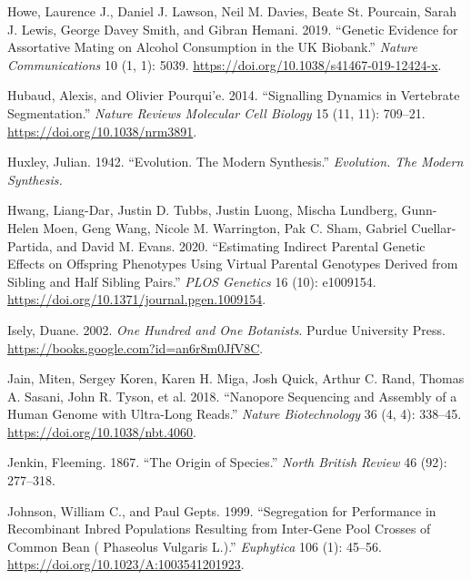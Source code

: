 \documentclass[
]{book}
\newlength{\cslhangindent}
\newlength{\cslentryspacingunit} %
\newenvironment{CSLReferences}[2] %
 {%
  \setlength{\parindent}{0pt}
  \ifodd #1
  \let\oldpar\par
  \def\par{\hangindent=\cslhangindent\oldpar}
  \fi
  \setlength{\parskip}{#2\cslentryspacingunit}
 }%
 {}
\begin{document}
\begin{CSLReferences}{1}{0}
\leavevmode{}%
Howe, Laurence J., Daniel J. Lawson, Neil M. Davies, Beate St. Pourcain, Sarah J. Lewis, George Davey Smith, and Gibran Hemani. 2019. {``Genetic Evidence for Assortative Mating on Alcohol Consumption in the {UK Biobank}.''} \emph{Nature Communications} 10 (1, 1): 5039. \url{https://doi.org/10.1038/s41467-019-12424-x}.

\leavevmode{}%
Hubaud, Alexis, and Olivier Pourqui'e. 2014. {``Signalling Dynamics in Vertebrate Segmentation.''} \emph{Nature Reviews Molecular Cell Biology} 15 (11, 11): 709--21. \url{https://doi.org/10.1038/nrm3891}.

\leavevmode{}%
Huxley, Julian. 1942. {``Evolution. {The} Modern Synthesis.''} \emph{Evolution. The Modern Synthesis.}

\leavevmode{}%
Hwang, Liang-Dar, Justin D. Tubbs, Justin Luong, Mischa Lundberg, Gunn-Helen Moen, Geng Wang, Nicole M. Warrington, Pak C. Sham, Gabriel Cuellar-Partida, and David M. Evans. 2020. {``Estimating Indirect Parental Genetic Effects on Offspring Phenotypes Using Virtual Parental Genotypes Derived from Sibling and Half Sibling Pairs.''} \emph{PLOS Genetics} 16 (10): e1009154. \url{https://doi.org/10.1371/journal.pgen.1009154}.

\leavevmode{}%
Isely, Duane. 2002. \emph{One {Hundred} and {One Botanists}}. {Purdue University Press}. \url{https://books.google.com?id=an6r8m0JfV8C}.

\leavevmode{}%
Jain, Miten, Sergey Koren, Karen H. Miga, Josh Quick, Arthur C. Rand, Thomas A. Sasani, John R. Tyson, et al. 2018. {``Nanopore Sequencing and Assembly of a Human Genome with Ultra-Long Reads.''} \emph{Nature Biotechnology} 36 (4, 4): 338--45. \url{https://doi.org/10.1038/nbt.4060}.

\leavevmode{}%
Jenkin, Fleeming. 1867. {``The Origin of Species.''} \emph{North British Review} 46 (92): 277--318.

\leavevmode{}%
Johnson, William C., and Paul Gepts. 1999. {``Segregation for Performance in Recombinant Inbred Populations Resulting from Inter-Gene Pool Crosses of Common Bean ( {Phaseolus} Vulgaris {L}.).''} \emph{Euphytica} 106 (1): 45--56. \url{https://doi.org/10.1023/A:1003541201923}.


\end{CSLReferences}
\end{document}
